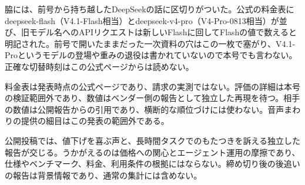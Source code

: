 脇には、前号から持ち越したDeepSeekの話に区切りがついた。公式の料金表にdeepseek-flash（V4.1-Flash相当）とdeepseek-v4-pro（V4-Pro-0813相当）が並び、旧モデル名へのAPIリクエストは新しいFlashに回してFlashの値で数えると明記された\cite{deepseekdocs}。前号で開いたままだった一次資料の穴はこの一枚で塞がり、V4.1-Proというモデルの登場や重みの退役は書かれていないので本号でも言わない。正確な切替時刻はこの公式ページからは読めない。

\begin{claimboundary}[資料と評価の境界]
料金表は発表時点の公式ページであり、請求の実測ではない。評価の詳細は本号の検証範囲外であり、数値はベンダー側の報告として独立した再現を待つ。相手の数値は公開報告からの引用であり、横断的な順位づけには使わない。音声まわりの提供の細目はこの発表の範囲外である。
\end{claimboundary}

\begin{communitynote}
公開投稿では、値下げを喜ぶ声と、長時間タスクでのもたつきを訴える独立した報告\cite{w39x-c1-regression}が交じる。うかがえるのは価格への関心とエージェント運用の摩擦であり、仕様やベンチマーク、料金、利用条件の根拠にはならない。締め切り後の後追いの報告は背景情報であり、通常の集計には含めない。
\end{communitynote}
